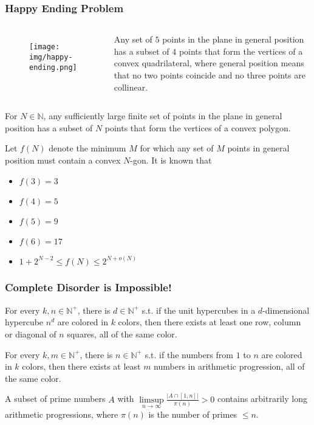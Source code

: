 \documentclass[UTF8,11pt,colorlinks,compress,openany]{beamer}%
\begin{document}
\begin{frame}\frametitle{Happy Ending Problem}
\vspace*{-2ex}
\begin{columns}
\begin{figure}[H]
\texttt{[image: img/happy-ending.png]}
\end{figure}
\begin{block}{}
Any set of $5$ points in the plane in general position has a subset of $4$ points that form the vertices of a convex quadrilateral, where general position means that no two points coincide and no three points are collinear.
\end{block}
\end{columns}
\begin{theorem}
For $N\in\mathbb{N}$, any sufficiently large finite set of points in the plane in general position has a subset of $N$ points that form the vertices of a convex polygon.
\end{theorem}
Let $f(N)$ denote the minimum $M$ for which any set of $M$ points in general position must contain a convex $N$-gon. It is known that
\begin{itemize}
	\item $f(3)=3$
	\item $f(4)=5$
	\item $f(5)=9$
	\item $f(6)=17$
	\item $1+2^{N-2}\leq f(N)\leq 2^{N+o(N)}$
\end{itemize}
\end{frame}

\begin{frame}\frametitle{Complete Disorder is Impossible!}
	\begin{theorem}
		For every $k,n\in\mathbb{N}^+$, there is $d\in\mathbb{N}^+$ s.t. if the unit hypercubes in a $d$-dimensional hypercube $n^d$ are colored in $k$ colors, then there exists at least one row, column or diagonal of $n$ squares, all of the same color.
	\end{theorem}
	\begin{theorem}
		For every $k,m\in\mathbb{N}^+$, there is $n\in\mathbb{N}^+$ s.t. if the numbers from $1$ to $n$ are colored in $k$ colors, then there exists at least $m$ numbers in arithmetic progression, all of the same color.
	\end{theorem}
	\begin{theorem}
		A subset of prime numbers $A$ with $\limsup\limits_{n\to\infty}\frac{|A\cap[1,n]|}{\pi(n)}>0$ contains arbitrarily long arithmetic progressions, where $\pi(n)$ is the number of primes $\leq n$.
	\end{theorem}
\end{frame}
\end{document}
